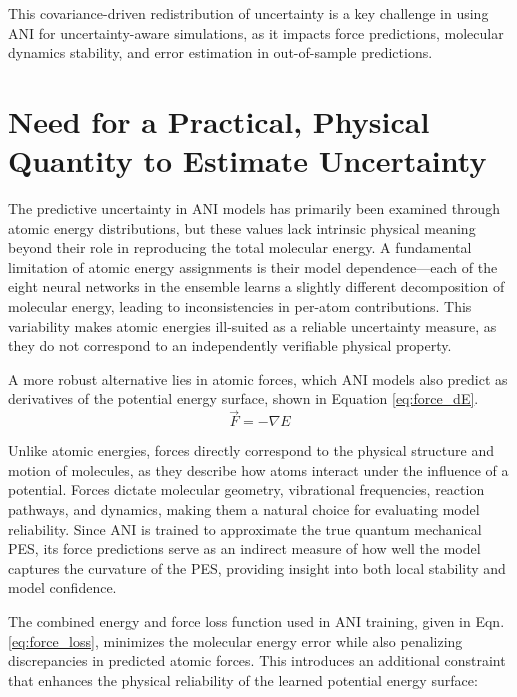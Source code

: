 This covariance-driven redistribution of uncertainty is a key challenge in using ANI for uncertainty-aware simulations, as it impacts force predictions, molecular dynamics stability, and error estimation in out-of-sample predictions.

\section{Need for a Practical, Physical Quantity to Estimate Uncertainty}
\label{sec:practical_physical_quantity_for_uncertainty}

The predictive uncertainty in ANI models has primarily been examined through atomic energy distributions, but these values lack intrinsic physical meaning beyond their role in reproducing the total molecular energy. A fundamental limitation of atomic energy assignments is their model dependence—each of the eight neural networks in the ensemble learns a slightly different decomposition of molecular energy, leading to inconsistencies in per-atom contributions. This variability makes atomic energies ill-suited as a reliable uncertainty measure, as they do not correspond to an independently verifiable physical property.

A more robust alternative lies in atomic forces, which ANI models also predict as derivatives of the potential energy surface, shown in Equation \ref{eq:force_dE}. 
\begin{equation}
    \vec{F} = -\nabla E
    \label{eq:force_dE}
\end{equation}

Unlike atomic energies, forces directly correspond to the physical structure and motion of molecules, as they describe how atoms interact under the influence of a potential. Forces dictate molecular geometry, vibrational frequencies, reaction pathways, and dynamics, making them a natural choice for evaluating model reliability. Since ANI is trained to approximate the true quantum mechanical PES, its force predictions serve as an indirect measure of how well the model captures the curvature of the PES, providing insight into both local stability and model confidence.

The combined energy and force loss function used in ANI training, given in Eqn. \ref{eq:force_loss}, minimizes the molecular energy error while also penalizing discrepancies in predicted atomic forces. This introduces an additional constraint that enhances the physical reliability of the learned potential energy surface:

